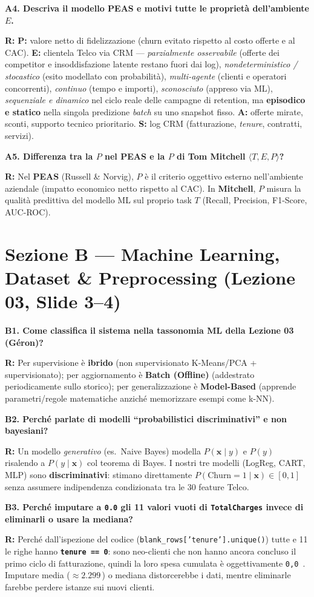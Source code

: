 \documentclass[10pt, a4paper]{article}
\newcommand{\qa}[2]{%
  \par\vspace{4pt}\noindent\textbf{\color{PrimaryNavy}#1}\par\vspace{1pt}%
  \noindent\textbf{\color{SecondaryBlue}R:} #2\par\vspace{2pt}%
}
\begin{document}
\qa{A4. Descriva il modello PEAS e motivi tutte le proprietà dell'ambiente $E$.}{
\textbf{P:} valore netto di fidelizzazione (churn evitato rispetto al costo offerte e al CAC).
\textbf{E:} clientela Telco via CRM --- \textit{parzialmente osservabile} (offerte dei competitor e insoddisfazione latente restano fuori dai log), \textit{nondeterministico / stocastico} (esito modellato con probabilità), \textit{multi-agente} (clienti e operatori concorrenti), \textit{continuo} (tempo e importi), \textit{sconosciuto} (appreso via ML), \textit{sequenziale e dinamico} nel ciclo reale delle campagne di retention, ma \textbf{episodico e statico} nella singola predizione \textit{batch} su uno snapshot fisso.
\textbf{A:} offerte mirate, sconti, supporto tecnico prioritario.
\textbf{S:} log CRM (fatturazione, \textit{tenure}, contratti, servizi).}

\qa{A5. Differenza tra la $P$ nel PEAS e la $P$ di Tom Mitchell $\langle T, E, P \rangle$?}{
Nel \textbf{PEAS} (Russell \& Norvig), $P$ è il criterio oggettivo esterno nell'ambiente aziendale (impatto economico netto rispetto al CAC). In \textbf{Mitchell}, $P$ misura la qualità predittiva del modello ML sul proprio task $T$ (Recall, Precision, F1-Score, AUC-ROC).}

\section*{Sezione B --- Machine Learning, Dataset \& Preprocessing (Lezione 03, Slide 3--4)}

\qa{B1. Come classifica il sistema nella tassonomia ML della Lezione 03 (Géron)?}{
Per supervisione è \textbf{ibrido} (non supervisionato K-Means/PCA + supervisionato); per aggiornamento è \textbf{Batch (Offline)} (addestrato periodicamente sullo storico); per generalizzazione è \textbf{Model-Based} (apprende parametri/regole matematiche anziché memorizzare esempi come k-NN).}

\qa{B2. Perché parlate di modelli ``probabilistici discriminativi'' e non bayesiani?}{
Un modello \textit{generativo} (es.\ Naive Bayes) modella $P(\mathbf{x} \mid y)$ e $P(y)$ risalendo a $P(y \mid \mathbf{x})$ col teorema di Bayes. I nostri tre modelli (LogReg, CART, MLP) sono \textbf{discriminativi}: stimano direttamente $P(\text{Churn}=1 \mid \mathbf{x}) \in [0, 1]$ senza assumere indipendenza condizionata tra le 30 feature Telco.}

\qa{B3. Perché imputare a \texttt{0.0} gli 11 valori vuoti di \texttt{TotalCharges} invece di eliminarli o usare la mediana?}{
Perché dall'ispezione del codice (\texttt{blank\_rows['tenure'].unique()}) tutte e 11 le righe hanno \textbf{\texttt{tenure == 0}}: sono neo-clienti che non hanno ancora concluso il primo ciclo di fatturazione, quindi la loro spesa cumulata è oggettivamente \texttt{0,0\,\texteuro}. Imputare media ($\approx 2.299$\,\texteuro) o mediana distorcerebbe i dati, mentre eliminarle farebbe perdere istanze sui nuovi clienti.}
\end{document}
